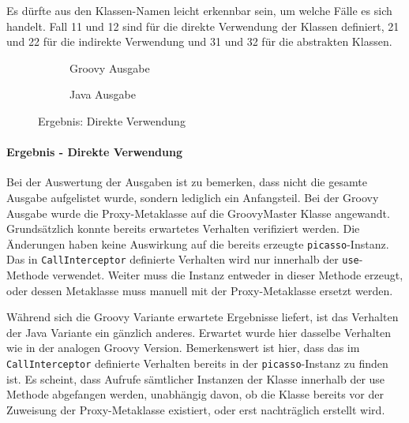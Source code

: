 Es dürfte aus den Klassen-Namen leicht erkennbar sein, um welche Fälle es sich handelt.
Fall 11 und 12 sind für die direkte Verwendung der Klassen definiert, 21 und 22  für die indirekte Verwendung und 31 und 32 für die abstrakten Klassen.







\begin{figure}[t!]
	\begin{subfigure}{\textwidth}
		
		\caption{Groovy Ausgabe}
		\label{fig:proxres-direct-groovy}
	\end{subfigure}

	\begin{subfigure}{\textwidth}
		
		\caption{Java Ausgabe}
		\label{fig:proxres-direct-java}
	\end{subfigure}
	
	\caption{Ergebnis: Direkte Verwendung}
	\label{fig:proxres-direct}
\end{figure}


\paragraph{Ergebnis - Direkte Verwendung}
Bei der Auswertung der Ausgaben ist zu bemerken, dass nicht die gesamte Ausgabe aufgelistet wurde, sondern lediglich ein Anfangsteil.
Bei der Groovy Ausgabe wurde die Proxy-Metaklasse auf die GroovyMaster Klasse angewandt. 
Grundsätzlich konnte bereits erwartetes Verhalten verifiziert werden. 
Die Änderungen haben keine Auswirkung auf die bereits erzeugte \texttt{picasso}-Instanz. 
Das in \texttt{CallInterceptor} definierte Verhalten wird nur innerhalb der \texttt{use}-Methode verwendet. Weiter muss die Instanz entweder in dieser Methode erzeugt, oder dessen Metaklasse muss manuell mit der Proxy-Metaklasse ersetzt werden.

Während sich die Groovy Variante erwartete Ergebnisse liefert, ist das Verhalten der Java Variante ein gänzlich anderes. 
Erwartet wurde hier dasselbe Verhalten wie in der analogen Groovy Version. 
Bemerkenswert ist hier, dass das im \texttt{CallInterceptor} definierte Verhalten bereits in der \texttt{picasso}-Instanz zu finden ist. 
Es scheint, dass Aufrufe sämtlicher Instanzen der Klasse innerhalb der use Methode abgefangen werden, unabhängig davon, ob die Klasse bereits vor der Zuweisung der Proxy-Metaklasse existiert, oder erst nachträglich erstellt wird.


